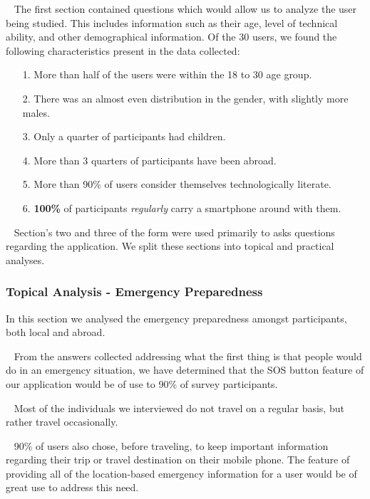 \documentclass{scrreprt}
\begin{document}
\par ~ The first section contained questions which would allow us to analyze the user being studied. This includes information such as their age, level of technical ability, and other demographical information. Of the 30 users, we found the following characteristics present in the data collected:
\begin{enumerate}
	\item[1.] More than half of the users were within the 18 to 30 age group.
	\item[2.] There was an almost even distribution in the gender, with slightly more males.
	\item[3.] Only a quarter of participants had children.
	\item[4.] More than 3 quarters of participants have been abroad.
	\item[5.] More than 90\% of users consider themselves technologically literate.
	\item[6.] \textbf{100\%} of participants \emph{regularly} carry a smartphone around with them.
\end{enumerate}

\par ~ Section's two and three of the form were used primarily to asks questions regarding the application. We split these sections into topical and practical analyses.

\subsubsection{Topical Analysis - Emergency Preparedness}
In this section we analysed the emergency preparedness amongst participants, both local and abroad.

\par ~ From the answers collected addressing what the first thing is that people would do in an emergency situation, we have determined that the SOS button feature of our application would be of use to 90\% of survey participants.

\par ~ Most of the individuals we interviewed do not travel on a regular basis, but rather travel occasionally. 

\par ~ 90\% of users also chose, before traveling, to keep important information regarding their trip or travel destination on their mobile phone. The feature of providing all of the location-based emergency information for a user would be of great use to address this need.
\end{document}
